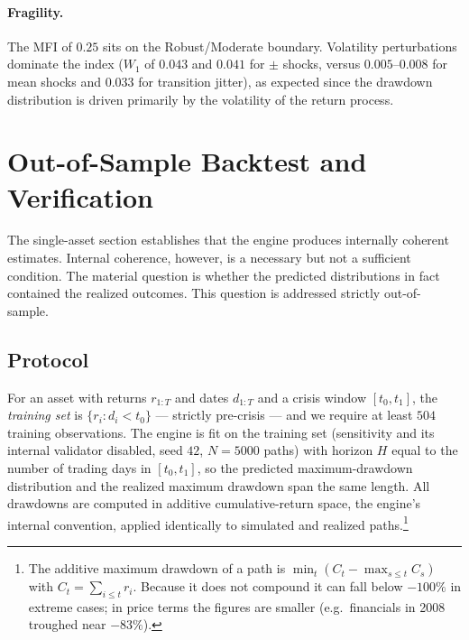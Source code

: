 \documentclass[11pt]{article}
\theoremstyle{definition}
\begin{document}
\paragraph{Fragility.}
The MFI of $0.25$ sits on the Robust/Moderate boundary. Volatility perturbations
dominate the index ($W_1$ of $0.043$ and $0.041$ for $\pm$ shocks, versus
$0.005$--$0.008$ for mean shocks and $0.033$ for transition jitter), as expected
since the drawdown distribution is driven primarily by the volatility of the
return process.

\section{Out-of-Sample Backtest and Verification}
\label{sec:backtest}

The single-asset section establishes that the engine produces internally coherent
estimates. Internal coherence, however, is a necessary but not a sufficient
condition. The material question is whether the predicted distributions in fact
contained the realized outcomes. This question is addressed strictly
out-of-sample.

\subsection{Protocol}
For an asset with returns $r_{1:T}$ and dates $d_{1:T}$ and a crisis window
$[t_0,t_1]$, the \emph{training set} is $\{r_i:d_i<t_0\}$ --- strictly
pre-crisis --- and we require at least $504$ training observations. The engine is
fit on the training set (sensitivity and its internal validator disabled, seed
$42$, $N=5000$ paths) with horizon $H$ equal to the number of trading days in
$[t_0,t_1]$, so the predicted maximum-drawdown distribution and the realized
maximum drawdown span the same length. All drawdowns are computed in additive
cumulative-return space, the engine's internal convention, applied identically
to simulated and realized paths.\footnote{The additive maximum drawdown of a
path is $\min_t(C_t-\max_{s\le t}C_s)$ with $C_t=\sum_{i\le t}r_i$. Because it
does not compound it can fall below $-100\%$ in extreme cases; in price terms the
figures are smaller (e.g.\ financials in 2008 troughed near $-83\%$).}
\end{document}
